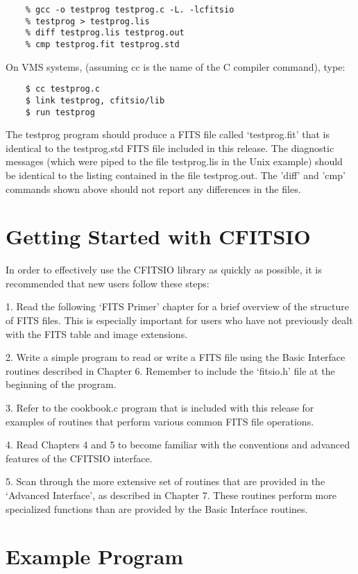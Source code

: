\begin{verbatim}
    % gcc -o testprog testprog.c -L. -lcfitsio
    % testprog > testprog.lis
    % diff testprog.lis testprog.out
    % cmp testprog.fit testprog.std
\end{verbatim}
 On VMS systems,
(assuming cc is the name of the C compiler command), type:

\begin{verbatim}
    $ cc testprog.c
    $ link testprog, cfitsio/lib
    $ run testprog
\end{verbatim}
The testprog program should produce a FITS file called `testprog.fit'
that is identical to the testprog.std FITS file included in this
release.  The diagnostic messages (which were piped to the file
testprog.lis in the Unix example) should be identical to the listing
contained in the file testprog.out.  The 'diff' and 'cmp' commands
shown above should not report any differences in the files.


\section{Getting Started with CFITSIO}

In order to effectively use the CFITSIO library as quickly as possible,
it is recommended that new users follow these steps:

1.  Read the following `FITS Primer' chapter for a brief
overview of the structure of FITS files.  This is especially important
for users who have not previously dealt with the FITS table and image
extensions.

2.  Write a simple program to read or write a FITS file using the Basic
Interface routines described in Chapter 6.  Remember to include the
`fitsio.h' file at the beginning of the program.

3.  Refer to the cookbook.c program that is included with this release
for examples of routines that perform various common FITS file
operations.

4. Read Chapters 4 and 5 to become familiar with the conventions and
advanced features of the CFITSIO interface.

5.  Scan through the more extensive set of routines that are provided
in the `Advanced Interface', as described in Chapter 7.  These routines
perform more specialized functions than are provided by the Basic
Interface routines.


\section{Example Program}

